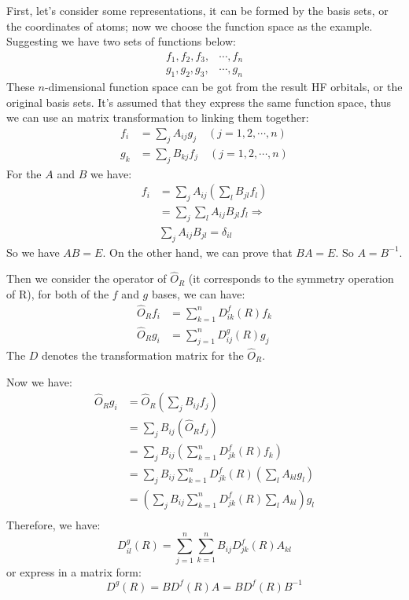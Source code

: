 First, let's consider some representations, it can be formed by the
basis sets, or the coordinates of atoms; now we choose the function
space as the example. Suggesting we have two sets of functions below:
\begin{align}\label{}
  f_{1}, f_{2}, f_{3}, &\cdots, f_{n} \nonumber \\
  g_{1}, g_{2}, g_{3}, &\cdots, g_{n}
\end{align}
These $n$-dimensional function space can be got from the result HF
orbitals, or the original basis sets. It's assumed that they express
the same function space, thus we can use an matrix transformation to
linking them together:
\begin{align}\label{}
  f_{i} &= \sum_{j}A_{ij}g_{j} \quad (j=1,2,\cdots, n) \nonumber \\
  g_{k} &= \sum_{j}B_{kj}f_{j} \quad (j=1,2,\cdots, n)
\end{align}
For the $A$ and $B$ we have:
\begin{align}\label{}
  f_{i} &= \sum_{j}A_{ij}(\sum_{l}B_{jl}f_{l}) \nonumber \\
  &= \sum_{j}\sum_{l}A_{ij}B_{jl}f_{l} \Rightarrow \nonumber \\
  &\sum_{j}A_{ij}B_{jl} = \delta_{il}
\end{align}
So we have $AB=E$. On the other hand, we can prove that $BA=E$. So
$A=B^{-1}$.

Then we consider the operator of $\hat{O}_{R}$ (it corresponds to the
symmetry operation of R), for both of the $f$ and $g$ bases, we can
have:
\begin{align}\label{}
  \hat{O}_{R} f_{i} &= \sum_{k=1}^{n}D^{f}_{ik}(R)f_{k} \nonumber \\
  \hat{O}_{R} g_{i} &= \sum_{j=1}^{n}D^{g}_{ij}(R)g_{j}
\end{align}
The $D$ denotes the transformation matrix for the $\hat{O}_{R}$.

Now we have:
\begin{align}\label{}
  \hat{O}_{R} g_{i} &= \hat{O}_{R}(\sum_{j}B_{ij}f_{j}) \nonumber \\
  &= \sum_{j}B_{ij}(\hat{O}_{R}f_{j}) \nonumber \\
  &= \sum_{j}B_{ij}(\sum_{k=1}^{n}D^{f}_{jk}(R)f_{k})\nonumber \\
  &= \sum_{j}B_{ij}\sum_{k=1}^{n}D^{f}_{jk}(R)(\sum_{l}A_{kl}g_{l})
  \nonumber \\
  &=(\sum_{j}B_{ij}\sum_{k=1}^{n}D^{f}_{jk}(R)\sum_{l}A_{kl})g_{l}
  \nonumber \\
\end{align}
Therefore, we have:
\begin{equation}\label{}
  D^{g}_{il}(R) =
  \sum_{j=1}^{n}\sum_{k=1}^{n}B_{ij}D^{f}_{jk}(R)A_{kl}
\end{equation}
or express in a matrix form:
\begin{equation}\label{}
  D^{g}(R) = BD^{f}(R)A = BD^{f}(R)B^{-1}
\end{equation}


